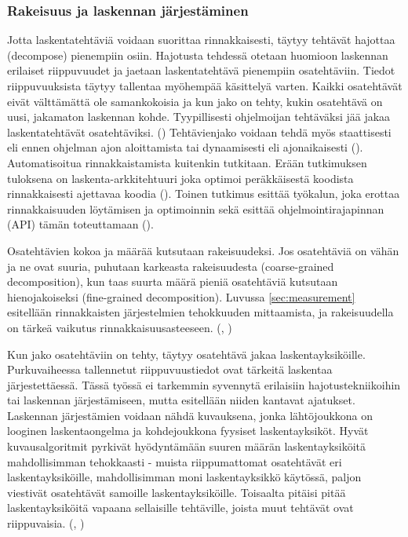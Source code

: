 \subsubsection{Rakeisuus ja laskennan järjestäminen}

Jotta laskentatehtäviä voidaan suorittaa rinnakkaisesti, täytyy tehtävät
hajottaa (decompose) pienempiin osiin. Hajotusta tehdessä otetaan huomioon laskennan
erilaiset riippuvuudet ja jaetaan laskentatehtävä pienempiin osatehtäviin.
Tiedot riippuvuuksista täytyy tallentaa myöhempää käsittelyä varten.
Kaikki osatehtävät eivät välttämättä ole samankokoisia ja kun jako on tehty,
kukin osatehtävä on uusi, jakamaton laskennan kohde. Tyypillisesti ohjelmoijan
tehtäväksi jää jakaa laskentatehtävät osatehtäviksi. (\citealt{intro})
Tehtävienjako voidaan tehdä myös staattisesti eli ennen ohjelman ajon
aloittamista tai dynaamisesti eli ajonaikaisesti (\citealt{rauber}).
Automatisoitua rinnakkaistamista kuitenkin tutkitaan. Erään tutkimuksen
tuloksena on laskenta-arkkitehtuuri joka optimoi peräkkäisestä koodista
rinnakkaisesti ajettavaa koodia (\citealt{apopei}). Toinen tutkimus esittää
työkalun, joka erottaa rinnakkaisuuden löytämisen ja optimoinnin sekä esittää
ohjelmointirajapinnan (API) tämän toteuttamaan (\citealt{dope}).

Osatehtävien kokoa ja määrää kutsutaan rakeisuudeksi. Jos osatehtäviä on vähän
ja ne ovat suuria, puhutaan karkeasta rakeisuudesta (coarse-grained
decomposition), kun taas suurta määrä pieniä osatehtäviä kutsutaan
hienojakoiseksi (fine-grained decomposition). Luvussa \ref{sec:measurement}
esitellään rinnakkaisten järjestelmien tehokkuuden mittaamista, ja rakeisuudella
on tärkeä vaikutus rinnakkaisuusasteeseen. (\citealt{intro}, \citealt{rauber})

Kun jako osatehtäviin on tehty, täytyy osatehtävä jakaa laskentayksiköille.
Purkuvaiheessa tallennetut riippuvuustiedot ovat tärkeitä laskentaa
järjestettäessä. Tässä työssä ei tarkemmin syvennytä erilaisiin
hajotustekniikoihin tai laskennan järjestämiseen, mutta esitellään niiden
kantavat ajatukset. Laskennan järjestämien voidaan nähdä kuvauksena, jonka
lähtöjoukkona on looginen laskentaongelma ja kohdejoukkona fyysiset laskentayksiköt.
Hyvät kuvausalgoritmit pyrkivät hyödyntämään suuren määrän laskentayksiköitä
mahdollisimman tehokkaasti - muista riippumattomat osatehtävät eri
laskentayksiköille, mahdollisimman moni laskentayksikkö käytössä,
paljon viestivät osatehtävät samoille laskentayksiköille.
Toisaalta pitäisi pitää laskentayksiköitä vapaana sellaisille tehtäville,
joista muut tehtävät ovat riippuvaisia. (\citealt{intro}, \citealt{rauber})


